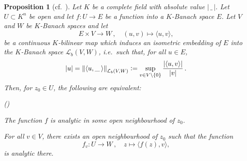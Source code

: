 \documentclass[a4paper, reqno, 10pt]{amsart}
\newtheorem{proposition}[theorem]{Proposition}
\theoremstyle{definition}
\newenvironment{altenumeratelevel2}
{\begin{list}
		{\textup{(\theenumi)} }
		{\usecounter{enumii}
			\setlength{\labelwidth}{2em}
			\setlength{\labelsep}{0pt}
			\setlength{\leftmargin}{2em}
			\setlength{\itemsep}{2pt}
			\setlength{\topsep}{2pt}
			\setlength{\itemindent}{0pt}
			\renewcommand{\theenumi}{\arabic{enumii}}
	}}
	{\end{list}}
\numberwithin{equation}{section}
\newcommand{\abs}[1]{{\lvert{#1}\rvert}}
\newcommand{\blank}{{\,\_\,}}
\newcommand{\defeq}{\vcentcolon=}
\newcommand{\lra}{\longrightarrow}
\newcommand{\lto}{\longmapsto}
\newcommand{\CL}{{\mathcal {L}}}
\begin{document}
\begin{proposition}[{cf.\ \cite[Prop.\ 1]{Browder62AnaPartDiffEq1}}]\label{Prop A1 - Strong and weak analytic functions on a Banach space}
Let $K$ be a complete field with absolute value $\abs{\blank}$.
Let $U \subset K^n$ be open and let $f \colon U \lra E$ be a function into a $K$-Banach space $E$.
Let $V$ and $W$ be $K$-Banach spaces and let 
\begin{equation}\label{Eq A1 - Bilinear pairing for weak and strong analytic functions on a Banach space}
	E \times V \lra W \, ,\quad  (u,v) \lto \langle u, v \rangle,
\end{equation}
be a continuous $K$-bilinear map which induces an isometric embedding of $E$ into the $K$-Banach space $\CL_b(V,W)$, i.e.\ such that, for all $u\in E$,
\[ \abs{u} = \left\| \langle u, \_\, \rangle \right\|_{\CL_b(V,W)} \defeq \sup_{v \in V \setminus \{0\}} \frac{\abs{\langle u,v \rangle}}{\abs{v}} \, .\]
Then, for $z_0 \in U$, the following are equivalent:
\begin{altenumeratelevel2}
	\item
	The function $f$ is analytic in some open neighbourhood of $z_0$.
	\item
	For all $v \in V$, there exists an open neighbourhood of $z_0$ such that the function
	\[f_v \colon U \lra W \, ,\quad  z \lto \langle f(z) , v\rangle ,\]
	is analytic there.
\end{altenumeratelevel2}
\end{proposition}
\end{document}
